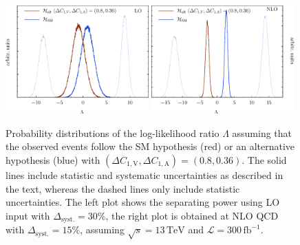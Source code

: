 \documentclass[preprint]{JHEP3}
\newcommand{\TeV}{\mathrm{TeV}}
\newcommand{\SM}{\mathrm{SM}}
\newcommand{\alt}{\mathrm{alt}}
\def\invfb {\mathrm{fb}^{-1}}
\def\DConeA{\Delta C_{1,\mathrm{A}}}
\def\DConeV{\Delta C_{1,\mathrm{V}}}
\def\HSM{\mathcal{H}_{\mathrm{SM}}}
\def\Halt{\mathcal{H}_{\mathrm{alt}}}
\newcommand{\be}{\begin{eqnarray}}
\newcommand{\ee}{\end{eqnarray}}
\begin{document}
\begin{figure}[t]
\centering %
\includegraphics[width=0.49\textwidth]{./LogLikelihoods_LO.eps}
\hfill
\includegraphics[width=0.49\textwidth]{./LogLikelihoods_NLO.eps}
\caption{\label{fig:vii}
Probability distributions of the log-likelihood ratio $\Lambda$ assuming that the observed events follow the SM hypothesis (red) or an alternative hypothesis (blue) 
with $(\DConeV,\DConeA)=(0.8,0.36)$.
The solid lines include statistic and systematic uncertainties as described in the text, whereas the dashed lines only include statistic uncertainties.
The left plot shows the separating power using LO input with $\Delta_\mathrm{syst.}=30\%$, 
the right plot is obtained at NLO QCD with $\Delta_\mathrm{syst.}=15\%$, assuming $\sqrt{s}=13\,\TeV$ and $\mathcal{L}=300\,\invfb$.
}
\end{figure}
\end{document}
